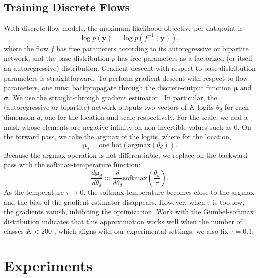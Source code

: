 \documentclass{article}
\newcommand{\mathbold}[1]{\ensuremath{\boldsymbol{\mathbf{#1}}}}
\newcommand{\nestedmathbold}[1]{{\mathbold{#1}}}
\newcommand{\mby}{\nestedmathbold{y}}
\newcommand{\mbmu}{\nestedmathbold{\mu}}
\newcommand{\mbsigma}{\nestedmathbold{\sigma}}
\begin{document}
\subsection{Training Discrete Flows}
With discrete flow models,
the maximum likelihood objective per datapoint is
\begin{equation*}
\log p(\mby) = \log p(f^{-1}(\mby)),
\end{equation*}
where the flow $f$ has free parameters according to its autoregressive or bipartite network, and the base distribution $p$ has free parameters as a factorized (or itself an autoregressive) distribution. Gradient descent with respect to base distribution parameters is straightforward. To perform gradient descent with respect to flow parameters, one must backpropagate through the discrete-output function $\mbmu$ and $\mbsigma$. We use the straight-through gradient estimator \citep{bengio2013estimating}. In particular, the (autoregressive or bipartite) network outputs two vectors of $K$ logits $\theta_d$ for each dimension $d$, one for the location and scale respectively. For the scale, we add a mask whose elements are negative infinity on non-invertible values such as 0. On the forward pass, we take the argmax of the logits, where for the location,
\begin{equation}
\label{eq:argmax}
\mbmu_{d} = \text{one\_hot}(\text{argmax}(\theta_{d})).
\end{equation}
Because the argmax operation is not differentiable, we replace  on the backward pass with the softmax-temperature function:
\begin{equation*}
\frac{d\mbmu_{d}}{d\theta_{d}} \approx \frac{d}{d\theta_{d}} \text{softmax}\left(\frac{\theta_{d}}{\tau}\right).
\end{equation*}
As the temperature $\tau\to0$, the softmax-temperature becomes close to the argmax and the bias of the gradient estimator disappears. However, when $\tau$ is too low, the gradients vanish, inhibiting the optimization.
Work with the Gumbel-softmax distribution indicates that this approximation works well when the number of classes $K<200$ \citep{maddison2016concrete,jang2017categorical}, which aligns with our experimental settings; we also fix
$\tau=0.1$.









\section{Experiments}
\label{sec:experiments}
\end{document}
